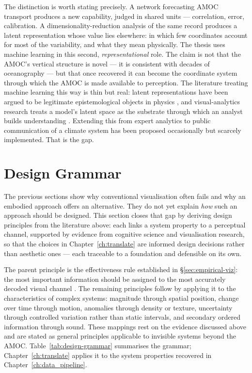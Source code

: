 The distinction is worth stating precisely. A network forecasting AMOC transport produces a new capability, judged in shared units --- correlation, error, calibration. A dimensionality-reduction analysis of the same record produces a latent representation whose value lies elsewhere: in which few coordinates account for most of the variability, and what they mean physically. The thesis uses machine learning in this second, \emph{representational} role. The claim is not that the AMOC's vertical structure is novel --- it is consistent with decades of oceanography \citep{hannachi2007, buckley2016} --- but that once recovered it can become the coordinate system through which the AMOC is made available to perception. The literature treating machine learning this way is thin but real: latent representations have been argued to be legitimate epistemological objects in physics \citep{iten2020}, and visual-analytics research treats a model's latent space as the substrate through which an analyst builds understanding \citep{sacha2018}. Extending this from expert analytics to public communication of a climate system has been proposed occasionally \citep{cabrera2023} but scarcely implemented. That is the gap.

\section{Design Grammar}
\label{sec:design-grammar}

The previous sections show why conventional visualisation often fails and why an embodied approach offers an alternative. They do not yet explain \emph{how} such an approach should be designed. This section closes that gap by deriving design principles from the literature above: each links a system property to a perceptual channel, supported by evidence from cognitive science and visualisation research, so that the choices in Chapter~\ref{ch:translate} are informed design decisions rather than aesthetic ones --- each traceable to a foundation and defensible on its own.

The parent principle is the effectiveness rule established in \S\ref{sec:empirical-viz}: the most important information should be assigned to the most accurately decoded visual channel \citep{bertin1983, clevelandmcgill1984, munzner2014}. The remaining principles follow by applying it to the characteristics of complex systems: magnitude through spatial position, change over time through motion, anomalies through density or texture, uncertainty through controlled variation rather than static intervals, and secondary ordered information through sound. These mappings rest on the evidence discussed above and are stated as general principles applicable to invisible systems beyond the AMOC. Table~\ref{tab:design-grammar} summarises the grammar; Chapter~\ref{ch:translate} applies it to the system properties recovered in Chapter~\ref{ch:data_pipeline}.

